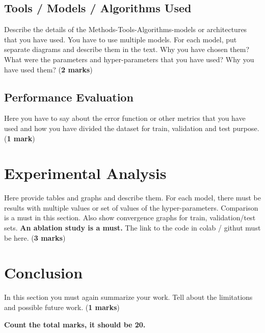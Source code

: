 \documentclass{article}
\begin{document}
\subsection{Tools / Models / Algorithms Used}
Describe the details of the Methods-Tools-Algorithms-models or architectures that you have used. You have to use multiple models. For each model, put separate diagrams and describe them in the text. Why you have chosen them? What were the parameters and hyper-parameters that you have used? Why you have used them? (\textbf{2 marks})

\subsection{Performance Evaluation}
Here you have to say about the error function or other metrics that you have used and how you have divided the dataset for train, validation and test purpose. (\textbf{1 mark})

\section{Experimental Analysis}
Here provide tables and graphs and describe them. For each model, there must be results with multiple values or set of values of the hyper-parameters. Comparison is a must in this section. Also show convergence graphs for train, validation/test sets. \textbf{An ablation study is a must.} The link to the code in colab / githut must be here. 
(\textbf{3 marks})
\section{Conclusion}
In this section you must again summarize your work. Tell about the limitations and possible future work. (\textbf{1 marks})

\noindent
\textbf{Count the total marks, it should be 20.}



\end{document}
